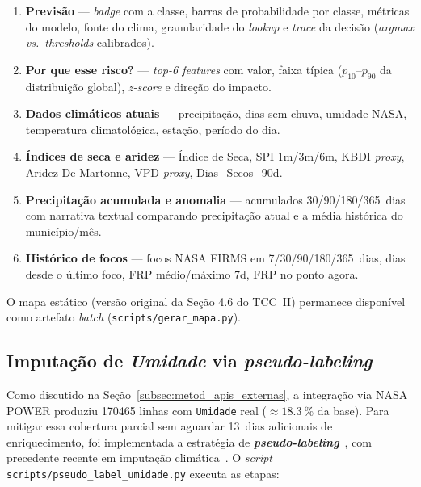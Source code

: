 \begin{enumerate}
  \item \textbf{Previsão} --- \emph{badge} com a classe, barras de probabilidade por classe, métricas do modelo, fonte do clima, granularidade do \emph{lookup} e \emph{trace} da decisão (\emph{argmax} \emph{vs.}\ \emph{thresholds} calibrados).
  \item \textbf{Por que esse risco?} --- \emph{top-6 features} com valor, faixa típica (\(p_{10}\)--\(p_{90}\) da distribuição global), \emph{z-score} e direção do impacto.
  \item \textbf{Dados climáticos atuais} --- precipitação, dias sem chuva, umidade NASA, temperatura climatológica, estação, período do dia.
  \item \textbf{Índices de seca e aridez} --- Índice de Seca, SPI 1m/3m/6m, KBDI \emph{proxy}, Aridez De Martonne, VPD \emph{proxy}, Dias\_Secos\_90d.
  \item \textbf{Precipitação acumulada e anomalia} --- acumulados 30/90/180/365~dias com narrativa textual comparando precipitação atual e a média histórica do município/mês.
  \item \textbf{Histórico de focos} --- focos NASA FIRMS em 7/30/90/180/365~dias, dias desde o último foco, FRP médio/máximo 7d, FRP no ponto agora.
\end{enumerate}

O mapa estático (versão original da Seção 4.6 do TCC~II) permanece disponível como artefato \emph{batch} (\texttt{scripts/gerar\_mapa.py}).

\subsection{Imputação de \emph{Umidade} via \emph{pseudo-labeling}}
\label{sec:metodologia_pseudo_label}

Como discutido na Seção~\ref{subsec:metod_apis_externas}, a integração via NASA POWER produziu \num{170465} linhas com \texttt{Umidade} real (\(\approx \SI{18,3}{\percent}\) da base). Para mitigar essa cobertura parcial sem aguardar 13~dias adicionais de enriquecimento, foi implementada a estratégia de \textbf{\emph{pseudo-labeling}}~\cite{lee2013pseudo}, com precedente recente em imputação climática~\cite{lopezgarcia2024spatiotemporal}. O \emph{script} \texttt{scripts/pseudo\_label\_umidade.py} executa as etapas:

